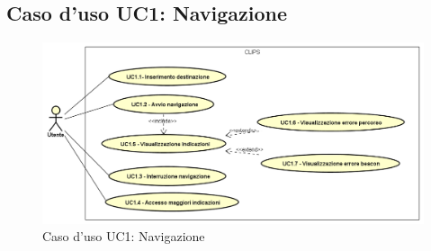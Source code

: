\documentclass[../AnalisiDeiRequisiti.tex]{subfiles}
\begin{document}
\subsection{Caso d'uso UC1: Navigazione}

        \begin{figure}[!h]
            \centering
            \includegraphics[scale=0.95, width=\textwidth]{img/UC1.png}
            \caption{Caso d'uso UC1: Navigazione}\label{fig:UC1} 
        \end{figure}
\end{document}
